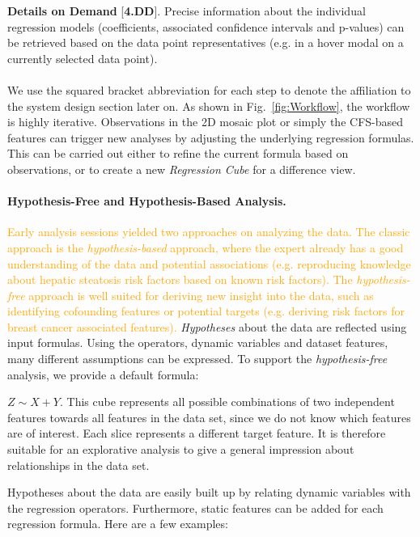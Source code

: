 \documentclass[journal]{style/vgtc} 			          %
\newcommand{\design}[1]{\textcolor{orange}{#1}}
\begin{document}
\textbf{Details on Demand} [\textbf{4.DD}]. Precise information about the individual regression models (coefficients, associated confidence intervals and p-values) can be retrieved based on the data point representatives (e.g. in a hover modal on a currently selected data point).
\\\\
We use the squared bracket abbreviation for each step to denote the affiliation to the system design section later on.
As shown in Fig.~\ref{fig:Workflow}, the workflow is highly iterative.
Observations in the 2D mosaic plot or simply the CFS-based features can trigger new analyses by adjusting the underlying regression formulas.
This can be carried out either to refine the current formula based on observations, or to create a new \emph{Regression Cube} for a difference view.
\paragraph{Hypothesis-Free and Hypothesis-Based Analysis.}
\design{
Early analysis sessions yielded two approaches on analyzing the data.
The classic approach is the \emph{hypothesis-based} approach, where the expert already has a good understanding of the data and potential associations (e.g. reproducing knowledge about hepatic steatosis risk factors based on known risk factors).
The \emph{hypothesis-free} approach is well suited for deriving new insight into the data, such as identifying cofounding features or potential targets (e.g. deriving risk factors for breast cancer associated features).
}
\emph{Hypotheses} about the data are reflected using input formulas.
Using the operators, dynamic variables and dataset features, many different assumptions can be expressed.
To support the \emph{hypothesis-free} analysis, we provide a default formula:

$Z \sim X + Y$.
This cube represents all possible combinations of two independent features towards all features in the data set, since we do not know which features are of interest.
Each slice represents a different target feature.
It is therefore suitable for an explorative analysis to give a general impression about relationships in the data set.

Hypotheses about the data are easily built up by relating dynamic variables with the regression operators.
Furthermore, static features can be added for each regression formula.
Here are a few examples:
\end{document}
